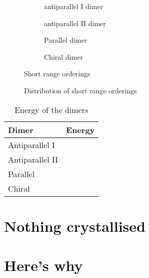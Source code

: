 \begin{figure}
    \begin{subfigure}{0.5\textwidth}
        \caption{antiparallel I dimer}
        \label{fig:antiparallel i}
    \end{subfigure}
    \begin{subfigure}{0.5\textwidth}
        \caption{antiparallel II dimer}
        \label{fig:antiparallel ii}
    \end{subfigure}
    \begin{subfigure}{0.5\textwidth}
        \caption{Parallel dimer}
        \label{fig:parallel}
    \end{subfigure}
    \begin{subfigure}{0.5\textwidth}
        \caption{Chiral dimer}
        \label{fig:chiral}
    \end{subfigure}
    \caption{Short range orderings}
    \label{fig:short range order}
\end{figure}

\begin{figure}
    \caption{Distribution of short range orderings}
    \label{fig:short order hist}
\end{figure}

\begin{table}
    \begin{tabular}{l r}
        Dimer & Energy \\ \hline
        Antiparallel I & \\
        Antiparallel II & \\
        Parallel & \\
        Chiral & \\
    \end{tabular}
    \caption{Energy of the dimers}
    \label{tab:dimer energy}
\end{table}

\section{Nothing crystallised}

\section{Here's why}


